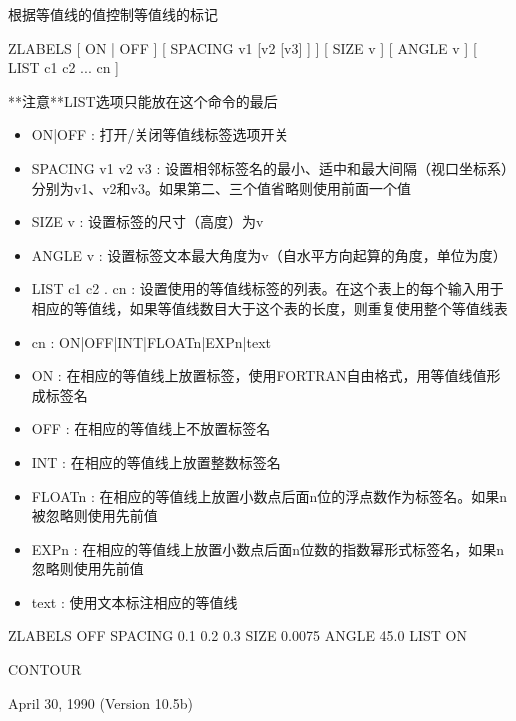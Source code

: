 \label{cmd:zlabels}

根据等值线的值控制等值线的标记

ZLABELS  [ ON | OFF ] [ SPACING v1 [v2 [v3] ] ] [ SIZE v ] [ ANGLE v ] [ LIST c1 c2 ... cn ]

**注意**LIST选项只能放在这个命令的最后

\begin{itemize}
\item ON|OFF : 打开/关闭等值线标签选项开关 
\item SPACING v1 v2 v3 : 设置相邻标签名的最小、适中和最大间隔（视口坐标系）分别为v1、v2和v3。如果第二、三个值省略则使用前面一个值 
\item SIZE v : 设置标签的尺寸（高度）为v 
\item ANGLE v : 设置标签文本最大角度为v（自水平方向起算的角度，单位为度） 
\item LIST c1 c2 . cn : 设置使用的等值线标签的列表。在这个表上的每个输入用于相应的等值线，如果等值线数目大于这个表的长度，则重复使用整个等值线表 
\item cn :  ON|OFF|INT|FLOATn|EXPn|text 
\item ON : 在相应的等值线上放置标签，使用FORTRAN自由格式，用等值线值形成标签名 
\item OFF : 在相应的等值线上不放置标签名 
\item INT : 在相应的等值线上放置整数标签名 
\item FLOATn : 在相应的等值线上放置小数点后面n位的浮点数作为标签名。如果n被忽略则使用先前值 
\item EXPn : 在相应的等值线上放置小数点后面n位数的指数幂形式标签名，如果n忽略则使用先前值 
\item text : 使用文本标注相应的等值线 
\end{itemize}

ZLABELS  OFF  SPACING 0.1 0.2 0.3  SIZE  0.0075 ANGLE 45.0  LIST ON

CONTOUR

April 30, 1990 (Version 10.5b)
